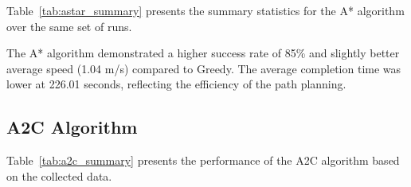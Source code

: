 \documentclass[conference]{IEEEtran}
\begin{document}
Table~\ref{tab:astar_summary} presents the summary statistics for the A* algorithm over the same set of runs.

\begin{table}[ht]
\centering
\caption{Summary statistics for the A* algorithm (100 runs).}
\label{tab:astar_summary}
\end{table}

The A* algorithm demonstrated a higher success rate of 85\% and slightly better average speed (1.04 m/s) compared to Greedy. The average completion time was lower at 226.01 seconds, reflecting the efficiency of the path planning.
\subsection{A2C Algorithm}

Table~\ref{tab:a2c_summary} presents the performance of the A2C algorithm based on the collected data.

\begin{table}[ht]
\centering
\caption{Summary statistics for the A2C algorithm (100 runs).}
\label{tab:a2c_summary}
\end{table}
\end{document}
